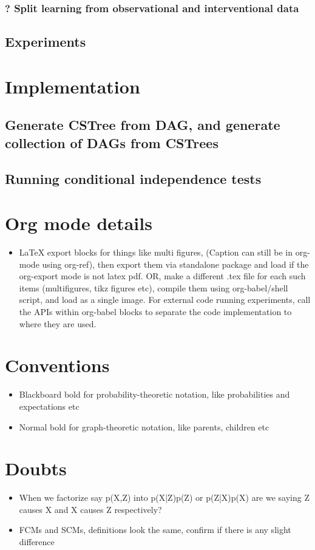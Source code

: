 \documentclass[11pt]{article}
\begin{document}
\subsubsection{? Split learning from observational and interventional data}
\label{sec:orgfb80962}
\subsection{Experiments}
\label{sec:orgc6c6b35}

\section{Implementation}
\label{sec:org8c279c5}
\subsection{Generate CSTree from DAG, and generate collection of DAGs from CSTrees}
\label{sec:orgad7c748}
\subsection{Running conditional independence tests}
\label{sec:org4694f47}

\section{Org mode details}
\label{sec:orge4cc01e}
\begin{itemize}
\item \LaTeX{} export blocks for things like multi figures, (Caption can still be in org-mode using org-ref), then export them via standalone package and load if the org-export mode is not latex pdf. OR, make a different .tex file for each such items (multifigures, tikz figures etc), compile them using org-babel/shell script, and load as a single image. For external code running experiments, call the APIs within org-babel blocks to separate the code implementation to where they are used.
\end{itemize}

\section{Conventions}
\label{sec:org3bb0e3f}
\begin{itemize}
\item Blackboard bold for probability-theoretic notation, like probabilities and expectations etc
\item Normal bold for graph-theoretic notation, like parents, children etc
\end{itemize}

\section{Doubts}
\label{sec:org903bdce}
\begin{itemize}
\item When we factorize say p(X,Z) into p(X|Z)p(Z) or p(Z|X)p(X) are we saying Z causes X and X causes Z respectively?
\item FCMs and SCMs, definitions look the same, confirm if there is any slight difference
\end{itemize}
\end{document}

